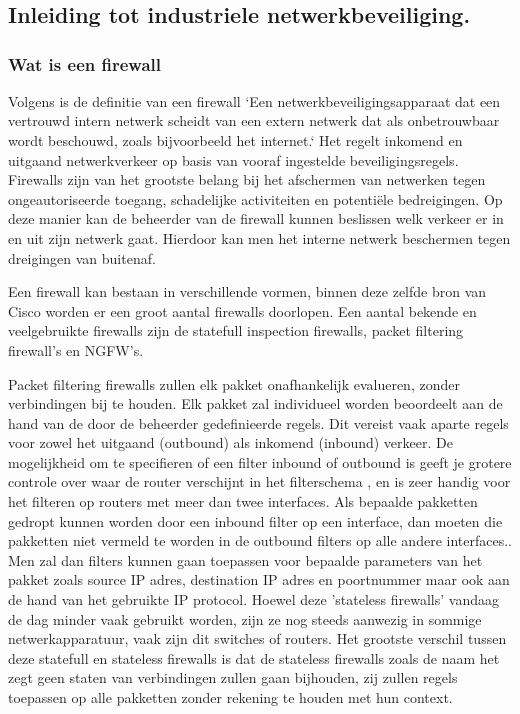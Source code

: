\chapter{}%
\label{ch:stand-van-zaken}

\section{Inleiding tot industriele netwerkbeveiliging.}

\subsection{Wat is een firewall}
Volgens \textcite{ciscoFW2025} is de definitie van een firewall `Een netwerkbeveiligingsapparaat dat een vertrouwd intern netwerk scheidt van een extern netwerk dat als onbetrouwbaar wordt beschouwd, zoals bijvoorbeeld het internet.` Het regelt inkomend en uitgaand netwerkverkeer op basis van vooraf ingestelde beveiligingsregels. Firewalls zijn van het grootste belang bij het afschermen van netwerken tegen ongeautoriseerde toegang, schadelijke activiteiten en potentiële bedreigingen.
Op deze manier kan de beheerder van de firewall kunnen beslissen welk verkeer er in en uit zijn netwerk gaat. Hierdoor kan men het interne netwerk beschermen tegen dreigingen van buitenaf.



Een firewall kan bestaan in verschillende vormen, binnen deze zelfde bron van Cisco worden er een groot aantal firewalls doorlopen. Een aantal bekende en veelgebruikte firewalls zijn de statefull inspection firewalls, packet filtering firewall's  en NGFW's.
 
Packet filtering firewalls zullen elk pakket onafhankelijk evalueren, zonder verbindingen bij te houden. Elk pakket zal individueel worden beoordeelt aan de hand van de door de beheerder gedefinieerde regels. Dit vereist vaak aparte regels voor zowel het uitgaand (outbound) als inkomend (inbound) verkeer. De mogelijkheid om te specifieren of een filter inbound of outbound is geeft je grotere controle over waar de router verschijnt in het filterschema , en is zeer handig voor het filteren op routers met meer dan twee interfaces. Als bepaalde pakketten gedropt kunnen worden door een inbound filter op een interface, dan moeten die pakketten niet vermeld te worden in de outbound filters op alle andere interfaces.. Men zal dan filters kunnen gaan toepassen voor bepaalde parameters van het pakket zoals source IP adres, destination IP adres en poortnummer maar ook aan de hand van het gebruikte IP protocol. Hoewel deze 'stateless firewalls' vandaag de dag minder vaak gebruikt worden, zijn ze nog steeds aanwezig in sommige netwerkapparatuur, vaak zijn dit switches of routers. Het grootste verschil tussen deze statefull en stateless firewalls is dat de stateless firewalls zoals de naam het zegt geen staten van verbindingen zullen gaan bijhouden, zij zullen regels toepassen op alle pakketten zonder rekening te houden met hun context. \autocite{goel2014}

